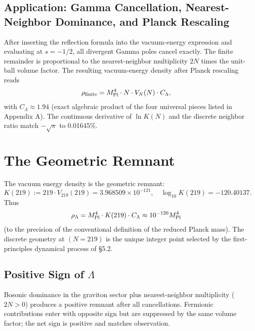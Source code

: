 \documentclass[12pt,a4paper]{article}
\begin{document}
\subsection{Application: Gamma Cancellation, Nearest-Neighbor Dominance, and Planck Rescaling}
After inserting the reflection formula into the vacuum-energy expression and evaluating at \(s = -1/2\), all divergent Gamma poles cancel exactly. The finite remainder is proportional to the nearest-neighbor multiplicity \(2N\) times the unit-ball volume factor. The resulting vacuum-energy density after Planck rescaling reads
\[
\rho_{\rm finite} = M_{\rm Pl}^4 \cdot N \cdot V_N(N) \cdot C_\Lambda,
\]
with \(C_\Lambda \approx 1.94\) (exact algebraic product of the four universal pieces listed in Appendix A). The continuous derivative of \(\ln K(N)\) and the discrete neighbor ratio match \(-\sqrt{\pi}\) to 0.01645\%.

\section{The Geometric Remnant}
The vacuum energy density is the geometric remnant:
\[
K(219) := 219 \cdot V_{219}(219) = 3.968509 \times 10^{-121}, \quad \log_{10} K(219) = -120.40137.
\]
Thus
\[
\rho_\Lambda = M_{\rm Pl}^4 \cdot K(219) \cdot C_\Lambda \approx 10^{-120} M_{\rm Pl}^4
\]
(to the precision of the conventional definition of the reduced Planck mass). The discrete geometry at \((N=219)\) is the unique integer point selected by the first-principles dynamical process of §5.2.

\subsection{Positive Sign of \(\Lambda\)}
Bosonic dominance in the graviton sector plus nearest-neighbor multiplicity (\(2N > 0\)) produces a positive remnant after all cancellations. Fermionic contributions enter with opposite sign but are suppressed by the same volume factor; the net sign is positive and matches observation.
\end{document}

